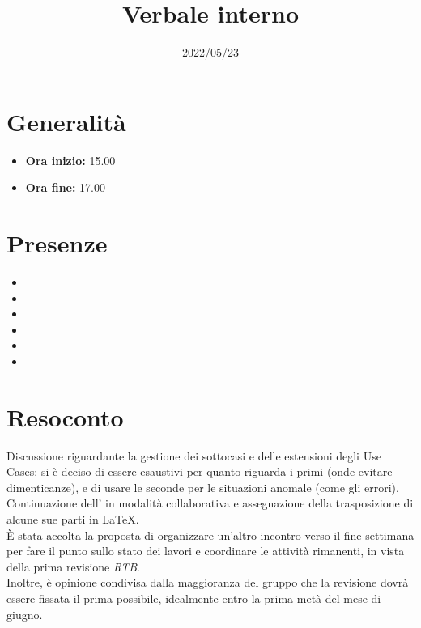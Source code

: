 \documentclass{classes/base}
\title{Verbale interno}
\date{2022/05/23}
\author{\marcov}
\renewcommand{\maketitle}{
    
}
\begin{document}
    \maketitle

    \section*{Generalità}
    \begin{itemize}
        \item \textbf{Ora inizio:} 15.00
        \item \textbf{Ora fine:} 17.00
    \end{itemize}

    \section*{Presenze}
    \begin{itemize}
        \item \tommaso
        \item \marcob
        \item \marcov
        \item \angela
        \item \giulio
        \item \matteo
    \end{itemize}
    
    \section*{Resoconto}
    Discussione riguardante la gestione dei sottocasi e delle estensioni degli Use Cases: si è deciso di essere esaustivi per quanto riguarda i primi (onde evitare dimenticanze), e di usare le seconde per le situazioni anomale (come gli errori). \\
    Continuazione dell'\AdR{} in modalità collaborativa e assegnazione della trasposizione di alcune sue parti in \LaTeX.\\
    È stata accolta la proposta di organizzare un'altro incontro verso il fine settimana per fare il punto sullo stato dei lavori e coordinare le attività rimanenti, in vista della prima revisione \textit{RTB}.\\
    Inoltre, è opinione condivisa dalla maggioranza del gruppo che la revisione dovrà essere fissata il prima possibile, idealmente entro la prima metà del mese di giugno.
\end{document}
